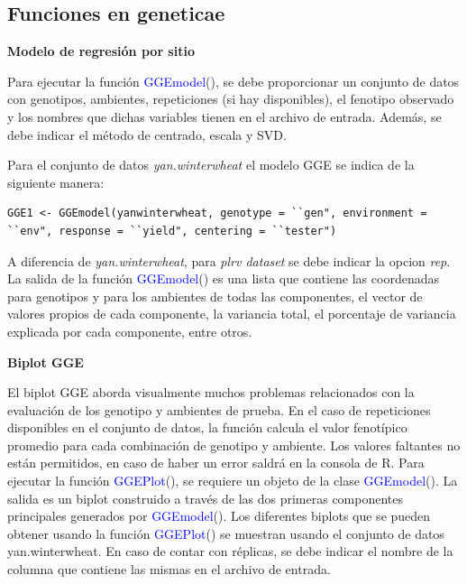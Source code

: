 \subsection{Funciones en geneticae}

\textbf{Modelo de regresión por sitio}

Para ejecutar la función \textcolor{blue}{GGEmodel}(), se debe proporcionar un conjunto de datos con genotipos, ambientes, repeticiones (si hay disponibles), el fenotipo observado y los nombres que dichas variables tienen en el archivo de entrada. Además, se debe indicar el método de centrado, escala y SVD. 

Para el conjunto de datos \emph{yan.winterwheat} el modelo GGE se indica de la siguiente manera:

\begin{tcolorbox}[colframe=aurometalsaurus,colback=backcolour,colbacklower=white,
   				width=1\linewidth,
    			height=0.1\linewidth,
    			boxsep=-3mm]
\begin{lstlisting}
GGE1 <- GGEmodel(yanwinterwheat, genotype = ``gen", environment = ``env", response = ``yield", centering = ``tester")
\end{lstlisting}
\end{tcolorbox}
A diferencia de \emph{yan.winterwheat}, para \emph{plrv dataset} se debe indicar la opcion \emph{rep}.
La salida de la función \textcolor{blue}{GGEmodel}() es una lista que contiene las coordenadas para genotipos y para los ambientes de todas las componentes, el vector de valores propios de cada componente, la variancia total, el porcentaje de variancia explicada por cada componente, entre otros.

\textbf{Biplot GGE}

El biplot GGE aborda visualmente muchos problemas relacionados con la evaluación de los genotipo y ambientes de prueba. En el caso de repeticiones disponibles en el conjunto de datos, la función calcula el valor fenotípico promedio para cada combinación de genotipo y ambiente. Los valores faltantes no están permitidos, en caso de haber un error saldrá en la consola de R. 
Para ejecutar la función \textcolor{blue}{GGEPlot}(), se requiere un objeto de la clase \textcolor{blue}{GGEmodel}(). La salida es un biplot construido a través de las dos primeras componentes principales generados por \textcolor{blue}{GGEmodel}().
Los diferentes biplots que se pueden obtener usando la función \textcolor{blue}{GGEPlot}() se muestran usando el conjunto de datos yan.winterwheat. En caso de contar con réplicas, se debe indicar el nombre de la columna que contiene las mismas en el archivo de entrada.

